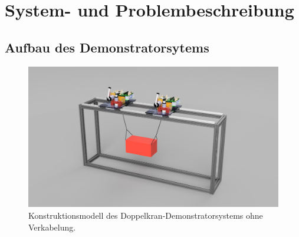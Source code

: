 \chapter{System- und Problembeschreibung}

\section{Aufbau des Demonstratorsytems}

\begin{figure}[ht]
	\begin{center}
		\includegraphics[scale=0.55]{Pictures/Veritas_demo_CAD.png}
	\end{center}
	\caption[Konstruktionsmodell des Doppelkransystems]
	{Konstruktionsmodell des Doppelkran-Demonstratorsystems ohne Verkabelung.}
	\label{fig:demonstrator_CAD}
\end{figure}

